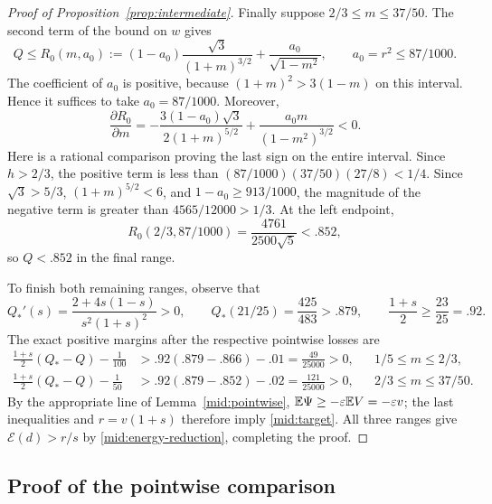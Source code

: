 \begin{proof}[Proof of Proposition~\ref{prop:intermediate}]
Finally suppose \(2/3\le m\le37/50\). The second term of the
bound on \(w\) gives
\begin{equation}\label{mid:Qhigh}
 Q\le R_0(m,a_0):=
 (1-a_0)\frac{\sqrt3}{(1+m)^{3/2}}+\frac{a_0}{\sqrt{1-m^2}},
 \qquad a_0=r^2\le87/1000.
\end{equation}
The coefficient of \(a_0\) is positive, because
\((1+m)^2>3(1-m)\) on this interval. Hence it suffices to take
\(a_0=87/1000\). Moreover,
\[
 \frac{\partial R_0}{\partial m}
 =-\frac{3(1-a_0)\sqrt3}{2(1+m)^{5/2}}
   +\frac{a_0m}{(1-m^2)^{3/2}}<0.
\]
Here is a rational comparison proving the last sign on the entire
interval. Since \(h>2/3\), the positive term is less than
\((87/1000)(37/50)(27/8)<1/4\). Since
\(\sqrt3>5/3\), \((1+m)^{5/2}<6\), and \(1-a_0\ge913/1000\),
the magnitude of the negative term is greater than
\(4565/12000>1/3\). At the left endpoint,
\[
 R_0(2/3,87/1000)=\frac{4761}{2500\sqrt5}<.852,
\]
so \(Q<.852\) in the final range.

To finish both remaining ranges, observe that
\[
 Q_*'(s)=\frac{2+4s(1-s)}{s^2(1+s)^2}>0,
 \qquad Q_*(21/25)=\frac{425}{483}>.879,
 \qquad \frac{1+s}{2}\ge\frac{23}{25}=.92.
\]
The exact positive margins after the respective pointwise losses are
\begin{align*}
 \frac{1+s}{2}(Q_*-Q)-\frac1{100}
 &>.92(.879-.866)-.01=\frac{49}{25000}>0,
       &&1/5\le m\le2/3,\\
 \frac{1+s}{2}(Q_*-Q)-\frac1{50}
 &>.92(.879-.852)-.02=\frac{121}{25000}>0,
       &&2/3\le m\le37/50.
\end{align*}
By the appropriate line of Lemma~\ref{mid:pointwise},
\(\mathbb E\Psi\ge-\varepsilon\mathbb E V=-\varepsilon v\); the last inequalities and
\(r=v(1+s)\) therefore imply \eqref{mid:target}.
All three ranges give \(\mathcal E(d)>r/s\) by
\eqref{mid:energy-reduction}, completing the proof.
\end{proof}

\subsection{Proof of the pointwise comparison}

